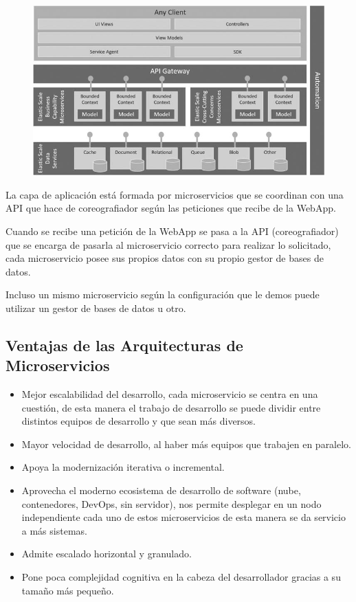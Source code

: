\documentclass[12pt, twoside, openright]{report} %
\begin{document}
\begin{figure}[H]
	{\includegraphics[scale=.8]{9781484212769_Fig03-03.jpg}}
\end{figure}
\vspace{-0.5cm}
La capa de aplicación está formada por microservicios que se coordinan con una API que hace de coreografiador según las peticiones que recibe de la WebApp.

Cuando se recibe una petición de la WebApp se pasa a la API (coreografiador) que se encarga de pasarla al microservicio correcto para realizar lo solicitado, cada microservicio posee sus propios datos con su propio gestor de bases de datos.

Incluso un mismo microservicio según la configuración que le demos puede utilizar un gestor de bases de datos u otro.

\subsection{Ventajas de las Arquitecturas de Microservicios}
\begin{itemize}
	\item Mejor escalabilidad del desarrollo, cada microservicio se centra en una cuestión, de esta manera el trabajo de desarrollo se puede dividir entre distintos equipos de desarrollo y que sean más diversos.
	\item Mayor velocidad de desarrollo, al haber más equipos que trabajen en paralelo.
	\item Apoya la modernización iterativa o incremental.
	\item Aprovecha el moderno ecosistema de desarrollo de software (nube, contenedores, DevOps, sin servidor), nos permite desplegar en un nodo independiente cada uno de estos microservicios de esta manera se da servicio a más sistemas.
	\item Admite escalado horizontal y granulado.
	\item Pone poca complejidad cognitiva en la cabeza del desarrollador gracias a su tamaño más pequeño.
\end{itemize}
\end{document}
